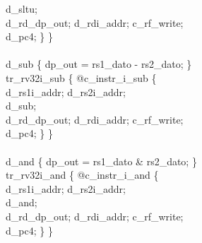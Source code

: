 {\indent \hspace{\parindent} d\_sltu; \\%
\indent \hspace{\parindent} d\_rd\_dp\_out; d\_rdi\_addr; c\_rf\_write;  \\%
\indent \hspace{\parindent} d\_pc4; \} \} \\%
\\
\indent d\_sub \{ dp\_out = rs1\_dato - rs2\_dato; \}\\%
\indent tr\_rv32i\_sub \{ @c\_instr\_i\_sub \{ \\%
\indent \hspace{\parindent} d\_rs1i\_addr; d\_rs2i\_addr; \\%
\indent \hspace{\parindent} d\_sub; \\%
\indent \hspace{\parindent} d\_rd\_dp\_out; d\_rdi\_addr; c\_rf\_write;  \\%
\indent \hspace{\parindent} d\_pc4; \} \} \\%
\\
\indent d\_and \{ dp\_out = rs1\_dato \& rs2\_dato; \}\\%
\indent tr\_rv32i\_and \{ @c\_instr\_i\_and \{ \\%
\indent \hspace{\parindent} d\_rs1i\_addr; d\_rs2i\_addr; \\%
\indent \hspace{\parindent} d\_and; \\%
\indent \hspace{\parindent} d\_rd\_dp\_out; d\_rdi\_addr; c\_rf\_write;  \\%
\indent \hspace{\parindent} d\_pc4; \} \} \\%
\\
}
